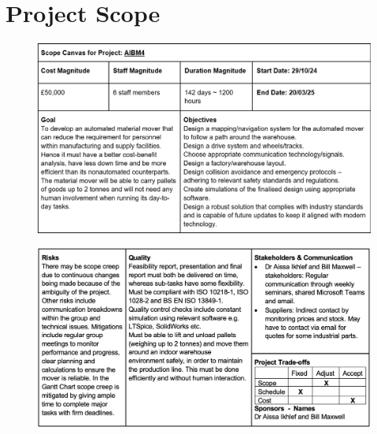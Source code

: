 \documentclass[12pt]{article}
\begin{document}
\section{Project Scope}
\begin{figure}[htbp]
    \centering
    \includegraphics[width=0.9\linewidth]{scope 1.png}
\end{figure}
\vspace{-3em}
\begin{figure}
    \centering
    \includegraphics[width=0.9\linewidth]{Screenshot 2024-12-10 at 13.44.07.png}
\end{figure}
\vspace{-3em}
\end{document}
